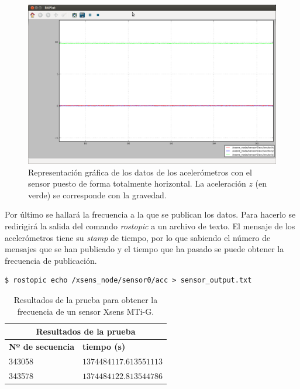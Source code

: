 \documentclass[12pt, a4paper]{report}
\begin{document}
\begin{figure}[h]
	\centering
		\includegraphics[scale=0.3]{../img/sensor_output.png} 
	\caption[Representación gráfica de los datos de los acelerómetros]{Representación gráfica de los datos de los acelerómetros con el sensor puesto de forma totalmente horizontal. La aceleración $z$ (en verde) se corresponde con la gravedad.} 
	\label{fig: sensor_output_hor}
\end{figure}

Por último se hallará la frecuencia a la que se publican los datos. Para hacerlo se redirigirá la salida del comando \textit{rostopic} a un archivo de texto. El mensaje de los acelerómetros tiene su \textit{stamp} de tiempo, por lo que sabiendo el número de mensajes que se han publicado y el tiempo que ha pasado se puede obtener la frecuencia de publicación.

\begin{verbatim}
$ rostopic echo /xsens_node/sensor0/acc > sensor_output.txt
\end{verbatim}

\begin{table}[h]
\footnotesize
\center
\begin{tabular}{|l|l|}
\hline
\multicolumn{2}{|c|}{\textbf{Resultados de la prueba}}\\
\hline
\textbf{Nº de secuencia} & \textbf{tiempo (s)} \\ 
\hline
343058 & $1374484117.613551113$ \\
343578 & $1374484122.813544786$ \\
\hline
\end{tabular}	
\caption[Resultados de la prueba para obtener la frecuencia de lectura de un sensor Xsens MTi-G]{Resultados de la prueba para obtener la frecuencia de un sensor Xsens MTi-G.}
\label{tab:prueba_1}	
\end{table}
\end{document}
